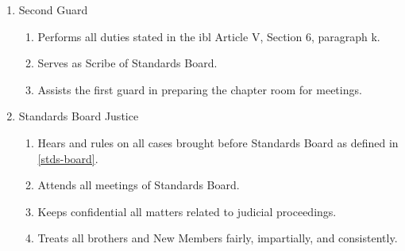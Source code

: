 \begin{enumerate}
		\item Second Guard
			\begin{enumerate}
				\item Performs all duties stated in the \gls{ibl} Article V, Section 6, paragraph k.
				\item Serves as Scribe of Standards Board.
				\item Assists the first guard in preparing the chapter room for meetings.
			\end{enumerate}
		\item Standards Board Justice
			\begin{enumerate}
				\item Hears and rules on all cases brought before Standards Board as defined in \autoref{stds-board}.
				\item Attends all meetings of Standards Board.
				\item Keeps confidential all matters related to judicial proceedings.
				\item Treats all brothers and New Members fairly, impartially, and consistently.
			\end{enumerate}


	\end{enumerate}

